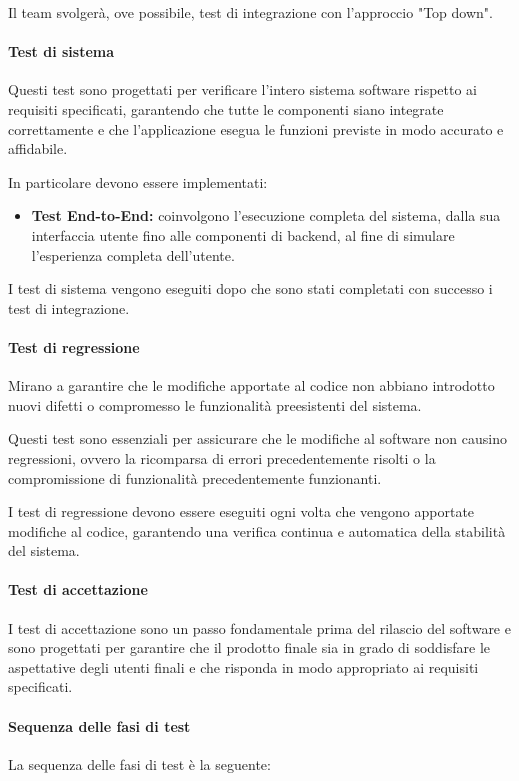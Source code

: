 Il team svolgerà, ove possibile, test di integrazione con l'approccio "Top down". 

\paragraph{Test di sistema}
Questi test sono progettati per verificare l'intero sistema software rispetto ai requisiti specificati, garantendo che tutte le componenti siano integrate correttamente e che l'applicazione esegua le funzioni previste in modo accurato e affidabile. 

In particolare devono essere implementati: 
\begin{itemize}
    \item  \textbf{Test End-to-End:} 
        coinvolgono l'esecuzione completa del sistema, dalla sua interfaccia utente fino alle componenti di backend, al fine di simulare l'esperienza completa dell'utente.
\end{itemize} 

I test di sistema vengono eseguiti dopo che sono stati completati con successo i test di integrazione. 

\paragraph{Test di regressione}
Mirano a garantire che le modifiche apportate al codice non abbiano introdotto nuovi difetti o compromesso le funzionalità preesistenti del sistema. 

Questi test sono essenziali per assicurare che le modifiche al software non causino regressioni, ovvero la ricomparsa di errori precedentemente risolti o la compromissione di funzionalità precedentemente funzionanti. 

I test di regressione devono essere eseguiti ogni volta che vengono apportate modifiche al codice, garantendo una verifica continua e automatica della stabilità del sistema. 

\paragraph{Test di accettazione}
I test di accettazione sono un passo fondamentale prima del rilascio del software e sono progettati per garantire che il prodotto finale sia in grado di soddisfare le aspettative degli utenti finali e che risponda in modo appropriato ai requisiti specificati. 

\paragraph*{Sequenza delle fasi di test}
La sequenza delle fasi di test è la seguente: 

